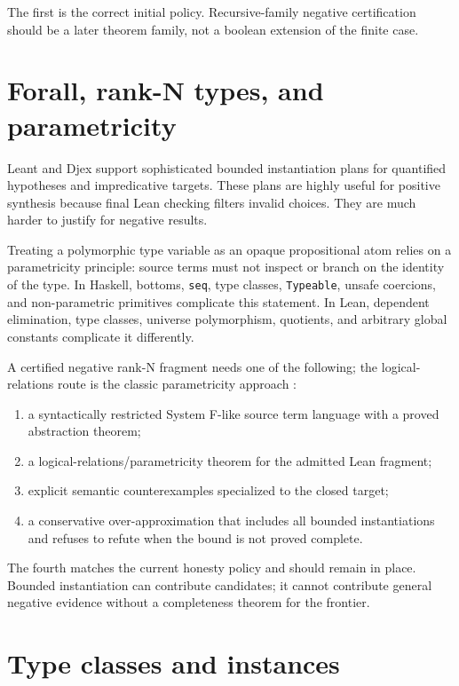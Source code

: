 \documentclass[11pt,letterpaper,openany]{report}
\theoremstyle{definition}
\theoremstyle{remark}
\newcommand{\code}[1]{\texttt{#1}}
\begin{document}
The first is the correct initial policy. Recursive-family negative certification should be a later theorem family, not a boolean extension of the finite case.

\section{Forall, rank-N types, and parametricity}
\label{sec:rankn}

Leant and Djex support sophisticated bounded instantiation plans for quantified hypotheses and impredicative targets. These plans are highly useful for positive synthesis because final Lean checking filters invalid choices. They are much harder to justify for negative results.

Treating a polymorphic type variable as an opaque propositional atom relies on a parametricity principle: source terms must not inspect or branch on the identity of the type. In Haskell, bottoms, \code{seq}, type classes, \code{Typeable}, unsafe coercions, and non-parametric primitives complicate this statement. In Lean, dependent elimination, type classes, universe polymorphism, quotients, and arbitrary global constants complicate it differently.

A certified negative rank-N fragment needs one of the following; the logical-relations route is the classic parametricity approach \cite{reynolds}:

\begin{enumerate}
\item a syntactically restricted System F-like source term language with a proved abstraction theorem;
\item a logical-relations/parametricity theorem for the admitted Lean fragment;
\item explicit semantic counterexamples specialized to the closed target;
\item a conservative over-approximation that includes all bounded instantiations and refuses to refute when the bound is not proved complete.
\end{enumerate}

The fourth matches the current honesty policy and should remain in place. Bounded instantiation can contribute candidates; it cannot contribute general negative evidence without a completeness theorem for the frontier.

\section{Type classes and instances}
\end{document}
